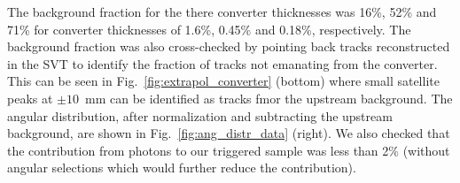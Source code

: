 The background fraction for the there converter thicknesses was 16\%, 52\% and 71\% 
for converter thicknesses of 1.6\%, 0.45\% and 0.18\%, respectively. The background fraction was also 
cross-checked by pointing back tracks reconstructed in the SVT to identify the fraction of tracks not emanating from the converter. This can be seen in Fig.~\ref{fig:extrapol_converter} (bottom) where small 
satellite peaks at $\pm 10$~mm can be identified as tracks fmor the upstream background. The angular distribution, after normalization and subtracting the upstream background, are shown in 
Fig.~\ref{fig:ang_distr_data} (right).  We also checked that the contribution from photons to our triggered 
sample was less than 2\% (without angular selections which would further reduce the contribution).


